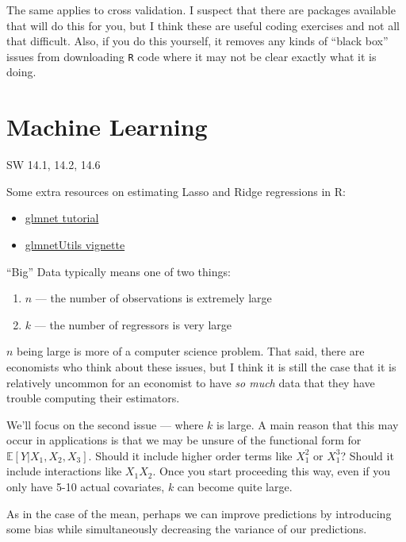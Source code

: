 \documentclass[
  letterpaper,
  DIV=11,
  numbers=noendperiod]{scrreprt}
\begin{document}
The same applies to cross validation. I suspect that there are packages
available that will do this for you, but I think these are useful coding
exercises and not all that difficult. Also, if you do this yourself, it
removes any kinds of ``black box'' issues from downloading \texttt{R}
code where it may not be clear exactly what it is doing.

\section{Machine Learning}\label{machine-learning}

SW 14.1, 14.2, 14.6

Some extra resources on estimating Lasso and Ridge regressions in R:

\begin{itemize}
\item
  \href{https://www.statology.org/lasso-regression-in-r/}{glmnet
  tutorial}
\item
  \href{https://cran.r-project.org/web/packages/glmnetUtils/vignettes/intro.html}{glmnetUtils
  vignette}
\end{itemize}

``Big'' Data typically means one of two things:

\begin{enumerate}
\def\labelenumi{\arabic{enumi}.}
\item
  \(n\) --- the number of observations is extremely large
\item
  \(k\) --- the number of regressors is very large
\end{enumerate}

\(n\) being large is more of a computer science problem. That said,
there are economists who think about these issues, but I think it is
still the case that it is relatively uncommon for an economist to have
\emph{so much} data that they have trouble computing their estimators.

We'll focus on the second issue --- where \(k\) is large. A main reason
that this may occur in applications is that we may be unsure of the
functional form for \(\mathbb{E}[Y|X_1,X_2,X_3]\). Should it include
higher order terms like \(X_1^2\) or \(X_1^3\)? Should it include
interactions like \(X_1 X_2\). Once you start proceeding this way, even
if you only have 5-10 actual covariates, \(k\) can become quite large.

As in the case of the mean, perhaps we can improve predictions by
introducing some bias while simultaneously decreasing the variance of
our predictions.
\end{document}
